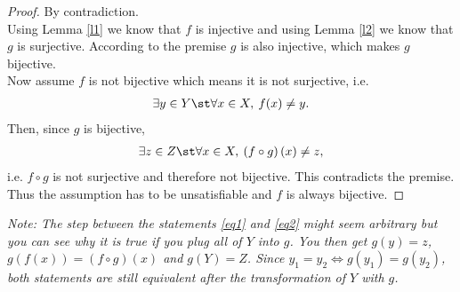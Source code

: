 \documentclass{article}
\begin{document}
\begin{proof}
  By contradiction.\\
  Using Lemma \ref{l1} we know that $f$ is injective and using Lemma \ref{l2} we know that $g$ is surjective.
  According to the premise $g$ is also injective, which makes $g$ bijective.\\
  Now assume $f$ is not bijective which means it is not surjective, i.e.
  \begin{align}
    \label{eq1}
    \exists y \in Y \st \forall x \in X,\: f(x)\not= y.
  \end{align}
  Then, since $g$ is bijective,
  \begin{align}
    \label{eq2}
    \exists z \in Z \st \forall x \in X,\: \left(f\circ g\right)(x)\not= z,
  \end{align}
  i.e. $f\circ g$ is not surjective and therefore not bijective.
  This contradicts the premise.
  Thus the assumption has to be unsatisfiable and $f$ is always bijective.
\end{proof}
\emph{Note: The step between the statements \ref{eq1} and \ref{eq2} might seem arbitrary but you can see why it is true if you plug all of $Y$ into $g$.
  You then get $g(y)=z$, $g(f(x))=(f\circ g)(x)$ and $g(Y)=Z$. Since $y_1=y_2\Leftrightarrow g(y_1)=g(y_2)$, both statements are still equivalent after the transformation of $Y$ with $g$.}
\end{document}
